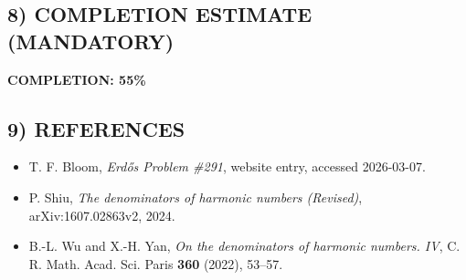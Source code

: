 \subsection*{8) COMPLETION ESTIMATE (MANDATORY)}
\textbf{COMPLETION: 55\%}

\subsection*{9) REFERENCES}
\begin{itemize}
	\item [Er291] T. F. Bloom, \emph{Erd\H{o}s Problem \#291}, website entry, accessed 2026-03-07.
	\item [Sh24] P. Shiu, \emph{The denominators of harmonic numbers (Revised)}, arXiv:1607.02863v2, 2024.
	\item [WuYa22] B.-L. Wu and X.-H. Yan, \emph{On the denominators of harmonic numbers. IV}, C. R. Math. Acad. Sci. Paris \textbf{360} (2022), 53--57.
\end{itemize}
